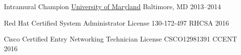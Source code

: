 

\begin{cvhonors}

  \cvhonor
    {Intramural Champion} %
    {\href{umaryland.edu}{University of Maryland}}
    {Baltimore, MD}
    {2013--2014}


    \cvhonor
    {Red Hat Certified System Administrator}
    {License 130-172-497}
    {RHCSA}
    {2016}

  \cvhonor
    {Cisco Certified Entry Networking Technician}
    {License CSCO12981391}
    {CCENT}
    {2016}

\end{cvhonors}

